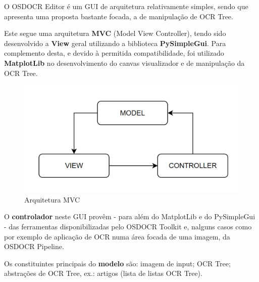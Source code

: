 O OSDOCR Editor é um GUI de arquitetura relativamente simples, sendo que apresenta uma proposta bastante focada, a de manipulação de OCR Tree. 

Este segue uma arquitetura \textbf{MVC} (Model View Controller), tendo sido desenvolvido a \textbf{View} geral utilizando a biblioteca \textbf{PySimpleGui}. Para complemento desta, e devido à permitida compatibilidade, foi utilizado \textbf{MatplotLib} no desenvolvimento do canvas visualizador e de manipulação da OCR Tree.

\begin{figure}[H]
	\centering
	\includegraphics[width=1\textwidth]{images/diagramas/MVC.png}
	\caption{Arquitetura MVC}
	\label{fig:arquitetura_mvc}
\end{figure}

O \textbf{controlador} neste GUI provêm - para além do MatplotLib e do PySimpleGui - das ferramentas disponibilizadas pelo OSDOCR Toolkit e, nalguns casos como por exemplo de aplicação de OCR numa área focada de uma imagem, da OSDOCR Pipeline.

Os constituintes principais do \textbf{modelo} são: imagem de input; OCR Tree; abstrações de OCR Tree, ex.: artigos (lista de listas OCR Tree).








